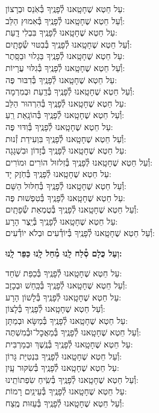 \documentclass[twoside, openany, parskip=half, 11pt]{book}
\begin{document}
עַל חֵטְא שֶׁחָטָֽאנוּ לְ֯פָנֶֽיךָ בְּ֯אֹֽנֵס וּבְרָצוֹן:\\ וְ֯עַל חֵטְא שֶׁחָטָֽאנוּ לְ֯פָנֶֽיךָ בְּ֯אִמוּץ הַלֵּב: \\
עַל חֵטְא שֶׁחָטָֽאנוּ לְ֯פָנֶֽיךָ בִּבְלִי דָֽעַת: \\ וְ֯עַל חֵטְא שֶׁחָטָֽאנוּ לְ֯פָנֶֽיךָ בְּ֯בִטּוּי שְׂ֯פָתָֽיִם:\\
עַל חֵטְא שֶׁחָטָֽאנוּ לְ֯פָנֶֽיךָ בַּגָלוּי וּבַסָּֽתֶר: \\ וְ֯עַל חֵטְא שֶׁחָטָֽאנוּ לְ֯פָנֶֽיךָ בְּ֯גִלּוּי עֲרָיוֹת: \\
עַל חֵטְא שֶׁחָטָֽאנוּ לְ֯פָנֶֽיךָ בְּ֯דִבּוּר פֶּה: \\ וְ֯עַל חֵטְא שֶׁחָטָֽאנוּ לְ֯פָנֶֽיךָ בְּ֯דַֽעַת וּבְמִרְמָה: \\
עַל חֵטְא שֶׁחָטָֽאנוּ לְ֯פָנֶֽיךָ בְּ֯הִרְהוּר הַלֵּב: \\ וְ֯עַל חֵטְא שֶׁחָטָֽאנוּ לְ֯פָנֶֽיךָ בְּ֯הוֹנָֽאַת רֵֽעַ: \\
עַל חֵטְא שֶׁחָטָֽאנוּ לְ֯פָנֶֽיךָ בְּ֯וִדּוּי פֶּה:\\ וְ֯עַל חֵטְא שֶׁחָטָֽאנוּ לְ֯פָנֶֽיךָ בִּוְעִידַת זְ֯נוּת: \\
עַל חֵטְא שֶׁחָטָֽאנוּ לְ֯פָנֶֽיךָ בְּ֯זָדוֹן וּבִשְׁגָגָה: \\ וְ֯עַל חֵטְא שֶׁחָטָֽאנוּ לְ֯פָנֶֽיךָ בְּ֯זִלזוּל הוֹרִים וּמוֹרִים:\\
עַל חֵטְא שֶׁחָטָֽאנוּ לְ֯פָנֶֽיךָ בְּ֯חֹֽזֶק יָד: \\ וְ֯עַל חֵטְא שֶׁחָטָֽאנוּ לְ֯פָנֶֽיךָ בְּ֯חִלּוּל הַשֵּׁם: \\
עַל חֵטְא שֶׁחָטָֽאנוּ לְ֯פָנֶֽיךָ בְּ֯טִפְשׁוּת פֶּה: \\ וְ֯עַל חֵטְא שֶׁחָטָֽאנוּ לְ֯פָנֶֽיךָ בְּ֯טֻמְאַת שְׂ֯פָתָֽיִם: \\
עַל חֵטְא שֶׁחָטָֽאנוּ לְ֯פָנֶֽיךָ בְּ֯יֵֽצֶר הָרָע: \\ וְ֯עַל חֵטְא שֶׁחָטָֽאנוּ לְ֯פָנֶֽיךָ בְּ֯יוֹדְ֯עִים וּבְלֹא יוֹדְ֯עִים:

\textbf{וְעַל כֻּלָם סְ֯לַח לָֽנוּ מְ֯חַל לָֽנוּ כַּפֵּר לָֽנוּ:}

עַל חֵטְא שֶׁחָטָֽאנוּ לְ֯פָנֶֽיךָ בְּ֯כַפַּת שֹֽׁחַד: \\ וְ֯עַל חֵטְא שֶׁחָטָֽאנוּ לְ֯פָנֶֽיךָ בְּ֯כַּֽחַשׁ וּבְכָזָב: \\
עַל חֵטְא שֶׁחָטָֽאנוּ לְ֯פָנֶֽיךָ בְּ֯לָשׁוֹן הָרָע:\\ וְ֯עַל חֵטְא שֶׁחָטָֽאנוּ לְ֯פָנֶֽיךָ בְּ֯לָצוֹן:\\
עַל חֵטְא שֶׁחָטָֽאנוּ לְ֯פָנֶֽיךָ בְּ֯מַשָּׂא וּבְמַתָּן: \\ וְ֯עַל חֵטְא שֶׁחָטָֽאנוּ לְ֯פָנֶֽיךָ בְּ֯מַאֲכׇל־וּבְ֯מִשְׁתֶּה:\\
עַל חֵטְא שֶׁחָטָֽאנוּ לְ֯פָנֶֽיךָ בְּ֯נֶֽשֶׁךְ וּבְמַרְבִּית:\\ וְ֯עַל חֵטְא שֶׁחָטָֽאנוּ לְ֯פָנֶֽיךָ בִּנְטִיַּת גָּרוֹן: \\
עַל חֵטְא שֶׁחָטָֽאנוּ לְ֯פָנֶֽיךָ בְּ֯שִׂקּוּר עָֽיִן:\\ וְ֯עַל חֵטְא שֶׁחָטָֽאנוּ לְ֯פָנֶֽיךָ בְּ֯שִֽׂיחַ שִׂפְתוֹתֵֽינוּ: \\
עַל חֵטְא שֶׁחָטָֽאנוּ לְ֯פָנֶֽיךָ בְּ֯עֵינַֽיִם רָמוֹת:\\ וְ֯עַל חֵטְא שֶׁחָטָֽאנוּ לְ֯פָנֶֽיךָ בְּ֯עַזּוּת מֶֽצַח:
\end{document}
